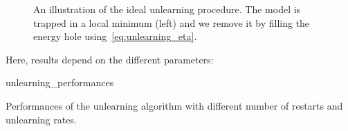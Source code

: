 \documentclass[\rootdir/main.tex]{subfiles}
\begin{document}
\begin{figure}
    \centering
    
    \caption{An illustration of the ideal unlearning procedure. The model is trapped in a local minimum (left) and we remove it by filling the energy hole using~\cref{eq:unlearning_eta}.}
\end{figure}
Here, results depend on the different parameters:
\begin{table}[hbt]
    \centering
    {unlearning_performances}
    \caption{Performances of the unlearning algorithm with different number of restarts and unlearning rates.}
\end{table}
\end{document}
